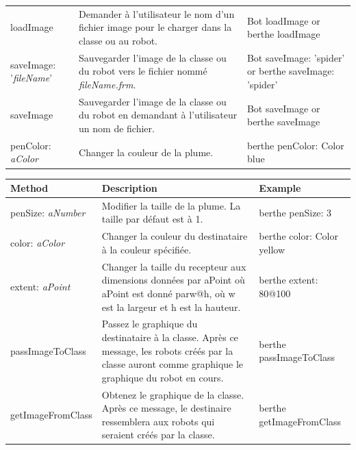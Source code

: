\documentclass[a4paper,10pt,twoside]{book}
\begin{document}
{\begin{tabular}{p{20mm}p{50mm}p{30mm}}
\textsf{loadImage} & Demander \`a l'utilisateur le nom d'un fichier image pour le charger dans la classe ou au robot. 
& \textsf{Bot loadImage} or \newline  \textsf{berthe loadImage} \\

\textsf{saveImage: '{\itshape fileName}'} & Sauvegarder l'image de la classe ou du robot vers le fichier nomm\'e
\emph{fileName.frm}. & \textsf{Bot saveImage: 'spider'} \newline or \newline  \textsf{berthe saveImage: 'spider'} \\

\textsf{saveImage} & Sauvegarder l'image de la classe ou du robot en demandant \`a l'utilisateur un nom de fichier. 
& \textsf{Bot saveImage} or \newline  \textsf{berthe saveImage} \\

\textsf{penColor: {\itshape aColor}} & 
Changer la couleur de la plume.
& \textsf{berthe penColor: Color blue} \\
\hline
\end{tabular}}

\noindent
{\small \begin{tabular}{p{20mm}p{50mm}p{30mm}}
\hline
\textbf{Method} & \textbf{Description} & \textbf{Example}\\
\hline

\textsf{penSize: {\itshape aNumber}} & 
Modifier la taille de la plume. La taille par d\'efaut est \`a 1.
& \textsf{berthe penSize: 3} \\

\textsf{color: {\itshape aColor}} & Changer la couleur du destinataire \`a la couleur sp\'ecifi\'ee. 
& \textsf{berthe color: Color yellow} \\ 

\textsf{extent: {\itshape aPoint}} & Changer la taille du recepteur aux dimensions donn\'ees par \textsf{aPoint}
où \textsf{aPoint} est donn\'e par\textsf{w@h}, où \textsf{w} est la largeur et \textsf{h} est la hauteur. & \textsf{berthe extent: 80@100} \\

 \textsf{passImageToClass} & Passez le graphique du destinataire \`a la classe. Apr\`es ce message, les robots cr\'e\'es par la classe auront comme graphique le graphique du robot en cours. & \textsf{berthe passImageToClass} \\
 
 \textsf{getImageFromClass} & Obtenez le graphique de la classe. Apr\`es ce message, le destinaire ressemblera aux robots qui seraient cr\'e\'es par la classe.  & \textsf{berthe getImageFromClass} \\
\hline
\end{tabular}}
\end{document}
